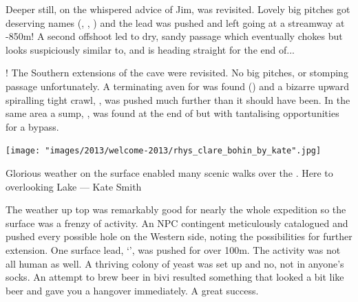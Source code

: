 Deeper still, on the whispered advice of Jim,  was revisited. Lovely big pitches got deserving names (, , ) and the lead was pushed and left going at a streamway at -850m! A second offshoot led to dry, sandy passage which eventually chokes but looks suspiciously similar to, and is heading straight for the end of...

! The Southern extensions of the cave were revisited. No big pitches, or stomping passage unfortunately. A terminating aven for  was found () and a bizarre upward spiralling tight crawl, , was pushed much further than it should have been. In the same area a sump, , was found at the end of  but with tantalising opportunities for a bypass.

\begin{marginfigure}
\texttt{[image: "images/2013/welcome-2013/rhys\_clare\_bohin\_by\_kate".jpg]}
\caption{Glorious weather on the surface enabled many scenic walks over the \protect{}. Here to \protect{} overlooking Lake \protect{} --- Kate Smith}
\label{rhys_clare_bohin}
\end{marginfigure}

The weather up top was remarkably good for nearly the whole expedition so the surface was a frenzy of activity. An NPC contingent meticulously catalogued and pushed every possible hole on the Western side, noting the possibilities for further extension. One surface lead, `', was pushed for over 100m. The activity was not all human as well. A thriving colony of yeast was set up and no, not in anyone's socks. An attempt to brew beer in bivi resulted something that looked a bit like beer and gave you a hangover immediately. A great success.


